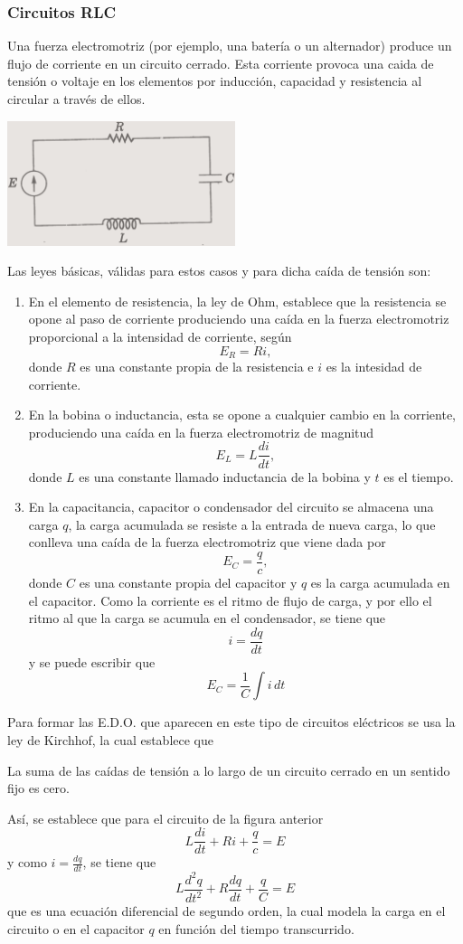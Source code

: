 \documentclass[letter,11pt]{article}
\begin{document}
\subsubsection{Circuitos RLC}
Una fuerza electromotriz (por ejemplo, una batería o un alternador) produce un flujo de corriente en un circuito cerrado. Esta corriente provoca una caida de tensi\'on o voltaje en los elementos por inducci\'on, capacidad y resistencia al circular a trav\'es de ellos.
\begin{center}
\includegraphics[width=0.5\textwidth]{rlc.eps}
\end{center}
Las leyes b\'asicas, v\'alidas para estos casos y para dicha ca\'ida de tensi\'on son:
\begin{enumerate}
\item En el elemento de resistencia, la ley de Ohm, establece que la resistencia se opone al paso de corriente produciendo una ca\'ida en la fuerza electromotriz proporcional a la intensidad de corriente, seg\'un
$$
E_R=Ri,
$$
donde $R$ es una constante propia de la resistencia e $i$ es la intesidad de corriente.
\item En la bobina o inductancia, esta se opone a cualquier cambio en la corriente, produciendo una ca\'ida en la fuerza electromotriz de magnitud
$$
E_L=L \frac{di}{dt},
$$
donde $L$ es una constante llamado inductancia de la bobina y $t$ es el tiempo.
\item En la capacitancia, capacitor o condensador del circuito se almacena una carga $q$, la carga acumulada se resiste a la entrada de nueva carga, lo que conlleva una ca\'ida de la fuerza electromotriz que viene dada por
$$
E_C=\frac{q}{c},
$$
donde $C$ es una constante propia del capacitor y $q$ es la carga acumulada en el capacitor. Como la corriente es el ritmo de flujo de carga, y por ello el ritmo al que la carga se acumula en el condensador, se tiene que
$$
i=\frac{dq}{dt}
$$
y se puede escribir que
$$
E_C=\frac{1}{C} \int i\,dt
$$
\end{enumerate}
Para formar las E.D.O. que aparecen en este tipo de circuitos el\'ectricos se usa la ley de Kirchhof, la cual establece que
\begin{center}
La suma de las ca\'idas de tensi\'on a lo largo de un circuito cerrado en un sentido fijo es cero.
\end{center}
As\'i, se establece que para el circuito de la figura anterior
$$
L\frac{di}{dt}+Ri+\frac{q}{c} =E
$$
y como $i=\frac{dq}{dt}$, se tiene que
$$
L\frac{d^2q}{dt^2}+R \frac{dq}{dt} + \frac{q}{C}=E
$$
que es una ecuaci\'on diferencial de segundo orden, la cual modela la carga en el circuito o en el capacitor $q$ en funci\'on del tiempo transcurrido.
\end{document}
